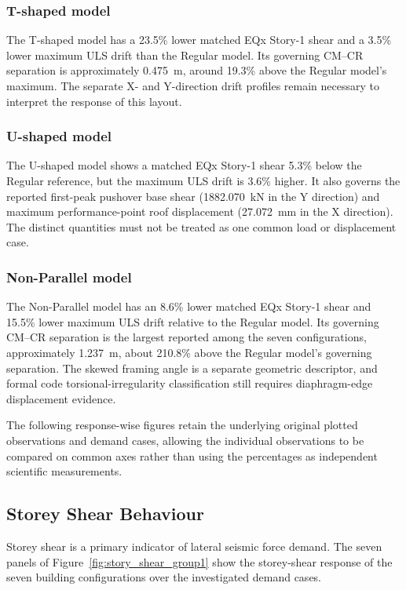 \subsubsection{T-shaped model}
The T-shaped model has a 23.5\% lower matched EQx Story-1 shear and a 3.5\% lower maximum ULS drift than the Regular model. Its governing CM--CR separation is approximately 0.475~m, around 19.3\% above the Regular model's maximum. The separate X- and Y-direction drift profiles remain necessary to interpret the response of this layout.

\subsubsection{U-shaped model}
The U-shaped model shows a matched EQx Story-1 shear 5.3\% below the Regular reference, but the maximum ULS drift is 3.6\% higher. It also governs the reported first-peak pushover base shear (1882.070~kN in the Y direction) and maximum performance-point roof displacement (27.072~mm in the X direction). The distinct quantities must not be treated as one common load or displacement case.

\subsubsection{Non-Parallel model}
The Non-Parallel model has an 8.6\% lower matched EQx Story-1 shear and 15.5\% lower maximum ULS drift relative to the Regular model. Its governing CM--CR separation is the largest reported among the seven configurations, approximately 1.237~m, about 210.8\% above the Regular model's governing separation. The skewed framing angle is a separate geometric descriptor, and formal code torsional-irregularity classification still requires diaphragm-edge displacement evidence.

The following response-wise figures retain the underlying original plotted observations and demand cases, allowing the individual observations to be compared on common axes rather than using the percentages as independent scientific measurements.

\subsection{Storey Shear Behaviour}
Storey shear is a primary indicator of lateral seismic force demand. The seven panels of Figure~\ref{fig:story_shear_group1} show the storey-shear response of the seven building configurations over the investigated demand cases.

